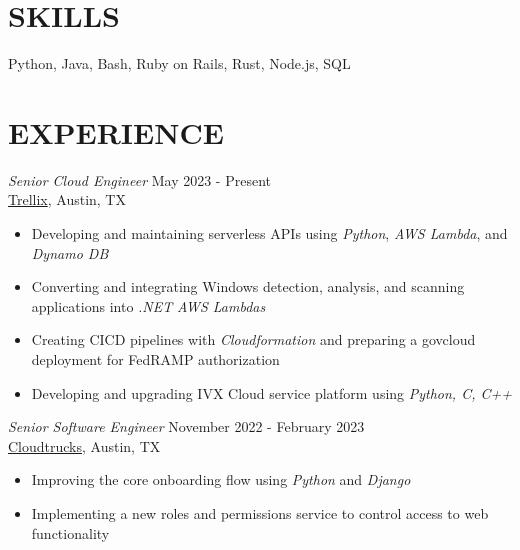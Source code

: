 \documentclass[margin, 9pt]{res} %
\begin{document}
\begin{resume}

\section{SKILLS}

Python, Java, Bash, Ruby on Rails, Rust, Node.js, SQL
 
 
\section{EXPERIENCE}
{\sl Senior Cloud Engineer} \hfill May 2023 - Present \\
\href{https://www.trellix.com/}{Trellix}, Austin, TX
\begin{itemize}
    \item Developing and maintaining serverless APIs using {\it Python}, {\it AWS Lambda}, and {\it Dynamo DB}
    \item Converting and integrating Windows detection, analysis, and scanning applications into {\it .NET} {\it AWS Lambdas}
    \item Creating CICD pipelines with {\it Cloudformation} and preparing a govcloud deployment for FedRAMP authorization
    \item Developing and upgrading IVX Cloud service platform using {\it Python, C, C++}
\end{itemize}


{\sl Senior Software Engineer} \hfill November 2022 - February 2023 \\
\href{https://www.cloudtrucks.com/}{Cloudtrucks}, Austin, TX
\begin{itemize}
    \item Improving the core onboarding flow using {\it Python} and {\it Django}
    \item Implementing a new roles and permissions service to control access to web functionality
\end{itemize}


\end{resume}
\end{document}
